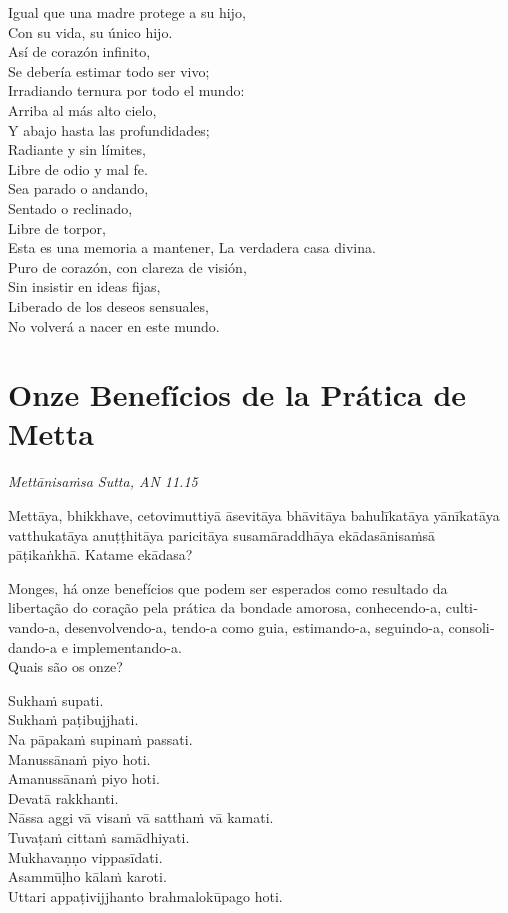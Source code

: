 Igual que una madre protege a su hijo,\\
Con su vida, su único hijo.\\
Así de corazón infinito,\\
Se debería estimar todo ser vivo;\\
Irradiando ternura por todo el mundo:\\
Arriba al más alto cielo,\\
Y abajo hasta	las profundidades;\\
Radiante y sin límites,\\
Libre de odio y mal fe.\\
Sea parado o andando,\\
Sentado o reclinado,\\
Libre de torpor,\\
Esta es una memoria a mantener,
La verdadera casa divina.\\

Puro de corazón, con clareza de visión,\\
Sin insistir en ideas fijas,\\
Liberado de los deseos sensuales,\\
No volverá a nacer en este mundo.
\chapter[Onze Benefícios]{Onze Benefícios de la Prática de Metta}

\emph{Mettānisaṁsa Sutta, AN 11.15}


\begin{leader}
\end{leader}

Mettāya, bhikkhave, cetovimuttiyā āsevitāya bhāvitāya bahulīkatāya yānīkatāya vatthukatāya anuṭṭhitāya paricitāya susamāraddhāya ekādasānisaṁsā pāṭikaṅkhā. Katame ekādasa?

\begin{english}
  Monges, há onze benefícios que podem ser esperados como resultado da libertação do coração pela prática da bondade amorosa, conhecendo-a, cultivando-a, desenvolvendo-a, tendo-a como guia, estimando-a, seguindo-a, consolidando-a e implementando-a.\\
  Quais são os onze?
\end{english}

Sukhaṁ supati.\\
Sukhaṁ paṭibujjhati.\\
Na pāpakaṁ supinaṁ passati.\\
Manussānaṁ piyo hoti.\\
Amanussānaṁ piyo hoti.\\
Devatā rakkhanti.\\
Nāssa aggi vā visaṁ vā satthaṁ vā kamati.\\
Tuvaṭaṁ cittaṁ samādhiyati.\\
Mukhavaṇṇo vippasīdati.\\
Asammūḷho kālaṁ karoti.\\
Uttari appaṭivijjhanto brahmalokūpago hoti.

